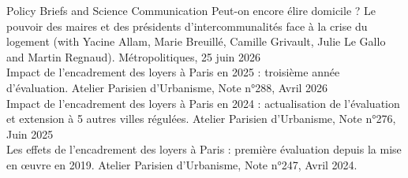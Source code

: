 \documentclass{resume} %
\begin{document}
\begin{rSection}{Policy Briefs and Science Communication}
\vspace*{4mm}
Peut-on encore élire domicile ? Le pouvoir des maires et des présidents d’intercommunalités face à la crise du logement (with Yacine Allam, Marie Breuillé, Camille Grivault, Julie Le Gallo and Martin Regnaud). Métropolitiques, 25 juin 2026\\

Impact de l'encadrement des loyers à Paris en 2025 : troisième année d'évaluation. Atelier Parisien d'Urbanisme, Note n°288, Avril 2026 \\

Impact de l'encadrement des loyers à Paris en 2024 : actualisation de l'évaluation et extension à 5 autres villes régulées. Atelier Parisien d'Urbanisme, Note n°276, Juin 2025 \\

Les effets de l'encadrement des loyers à Paris : première évaluation depuis la mise en œuvre en 2019. Atelier Parisien d'Urbanisme, Note n°247, Avril 2024. \\
\end{rSection}
\end{document}
